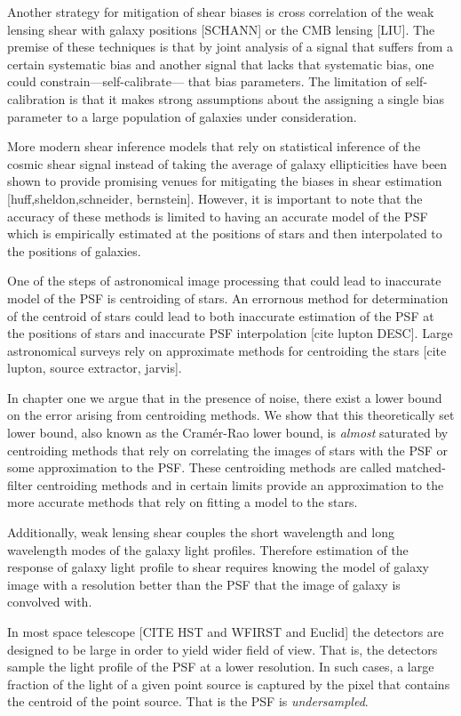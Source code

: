 Another strategy for mitigation of shear biases is cross correlation of the weak lensing shear with galaxy positions [SCHANN] or the CMB lensing [LIU].
The premise of these techniques is that by joint analysis of a signal that suffers from a certain systematic bias and another signal that lacks that systematic bias, 
one could constrain---self-calibrate--- that bias parameters. The limitation of self-calibration is that it makes strong assumptions about the assigning a single bias parameter 
to a large population of galaxies under consideration.  

More modern shear inference models that rely on statistical inference of the cosmic shear signal instead of 
taking the average of galaxy ellipticities have been shown to provide promising 
venues for mitigating the biases in shear estimation [huff,sheldon,schneider, bernstein]. 
However, it is important to note that the accuracy of these methods is limited to 
having an accurate model of the PSF which is empirically estimated at the positions of stars and 
then interpolated to the positions of galaxies.

One of the steps of astronomical image processing that could lead to inaccurate model of the PSF is centroiding 
of stars. An errornous method for determination of the centroid of stars could lead to both inaccurate estimation of the 
PSF at the positions of stars and inaccurate PSF interpolation [cite lupton DESC]. Large astronomical surveys rely on approximate 
methods for centroiding the stars [cite lupton, source extractor, jarvis]. 

In chapter one we argue that in the presence of noise, there exist
a lower bound on the error arising from centroiding methods. We show that this theoretically set lower bound, also known as the Cram\'{e}r-Rao lower bound, 
is \emph{almost} saturated by centroiding methods that rely on correlating the images of stars with the PSF or some approximation to the 
PSF. These centroiding methods are called matched-filter centroiding methods and in certain limits provide an approximation to the more accurate 
methods that rely on fitting a model to the stars. 

Additionally, weak lensing shear couples the short wavelength and long wavelength modes of the galaxy light profiles. 
Therefore estimation of the response of galaxy light profile to shear requires knowing the model of galaxy image 
with a resolution better than the PSF that the image of galaxy is convolved with. 

In most space telescope [CITE HST and WFIRST and Euclid] the detectors are designed to be large in order to yield wider field of view. 
That is, the detectors sample the light profile of the PSF at a lower resolution. In such cases, a large fraction of the light of a given point source 
is captured by the pixel that contains the centroid of the point source. That is the PSF is \emph{undersampled}.

